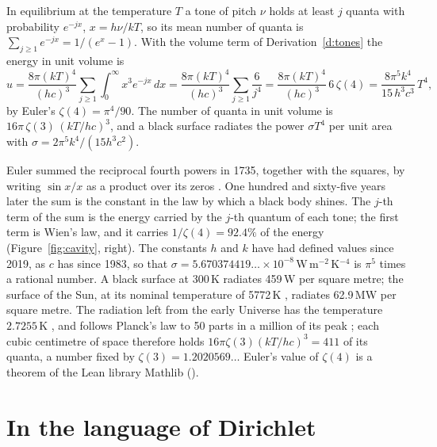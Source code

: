 \documentclass[11pt]{article}
\begin{document}
\begin{derivation}\label{d:planck}
In equilibrium at the temperature $T$ a tone of pitch $\nu$ holds at least $j$ quanta with probability $e^{-jx}$, $x = h\nu/kT$, so its mean number of quanta is $\sum_{j\ge1}e^{-jx} = 1/(e^x-1)$.
With the volume term of Derivation~\ref{d:tones} the energy in unit volume is
\[
  u = \frac{8\pi(kT)^4}{(hc)^3}\sum_{j\ge1}\int_0^\infty x^3e^{-jx}\,dx
    = \frac{8\pi(kT)^4}{(hc)^3}\sum_{j\ge1}\frac{6}{j^4}
    = \frac{8\pi(kT)^4}{(hc)^3}\,6\,\zeta(4)
    = \frac{8\pi^5k^4}{15\,h^3c^3}\,T^4 ,
\]
by Euler's $\zeta(4) = \pi^4/90$.
The number of quanta in unit volume is $16\pi\,\zeta(3)\,(kT/hc)^3$, and a black surface radiates the power $\sigma T^4$ per unit area with $\sigma = 2\pi^5k^4/(15h^3c^2)$.
\end{derivation}

\physical
Euler summed the reciprocal fourth powers in 1735, together with the squares, by writing $\sin x/x$ as a product over its zeros \cite{Euler}.
One hundred and sixty-five years later the sum is the constant in the law by which a black body shines.
The $j$-th term of the sum is the energy carried by the $j$-th quantum of each tone; the first term is Wien's law, and it carries $1/\zeta(4) = 92.4\%$ of the energy (Figure~\ref{fig:cavity}, right).
The constants $h$ and $k$ have had defined values since 2019, as $c$ has since 1983, so that $\sigma = 5.670374419\ldots\times10^{-8}$\,W\,m$^{-2}$\,K$^{-4}$ is $\pi^5$ times a rational number.
A black surface at 300\,K radiates 459\,W per square metre; the surface of the Sun, at its nominal temperature of 5772\,K \cite{Prsa}, radiates 62.9\,MW per square metre.
The radiation left from the early Universe has the temperature $2.7255$\,K \cite{Fixsen2009}, and follows Planck's law to 50 parts in a million of its peak \cite{Fixsen1996}; each cubic centimetre of space therefore holds $16\pi\zeta(3)(kT/hc)^3 = 411$ of its quanta, a number fixed by $\zeta(3) = 1.2020569\ldots$
Euler's value of $\zeta(4)$ is a theorem of the Lean library Mathlib ().

\section{In the language of Dirichlet}
\end{document}
